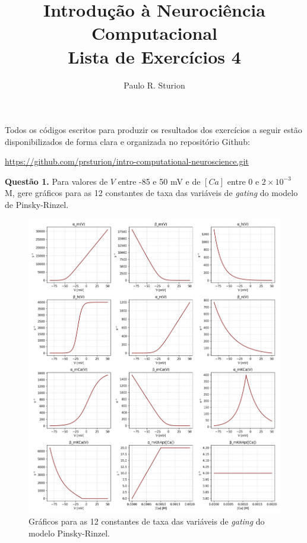 \documentclass[english,11pt,a4paper]{article}
\title{Introdução à Neurociência Computacional\\Lista de Exercícios 4}
\author{Paulo R. Sturion}
\begin{document}
	\maketitle
	
	\noindent Todos os códigos escritos para produzir os resultados dos exercícios a seguir estão disponibilizados de forma clara e organizada no repositório Github:
	
	\begin{center}
		\noindent \href{https://github.com/prsturion/intro-computational-neurosciene.git}{https://github.com/prsturion/intro-computational-neuroscience.git} \newline
	\end{center}
	
	\noindent \textbf{Questão 1.} Para valores de \(V\) entre -85 e 50 mV e de \([Ca]\) entre 0 e \(2 \times 10^{-3}\) M, gere gráficos para as 12 constantes de taxa das variáveis de \textit{gating} do modelo de Pinsky-Rinzel.
	
	\begin{figure}[H]
		\centering
		\includegraphics[width=12cm]{../figures/ex_1.png}
		\caption{Gráficos para as 12 constantes de taxa das variáveis de \textit{gating} do modelo Pinsky-Rinzel.}
	\end{figure}
	
\end{document}
